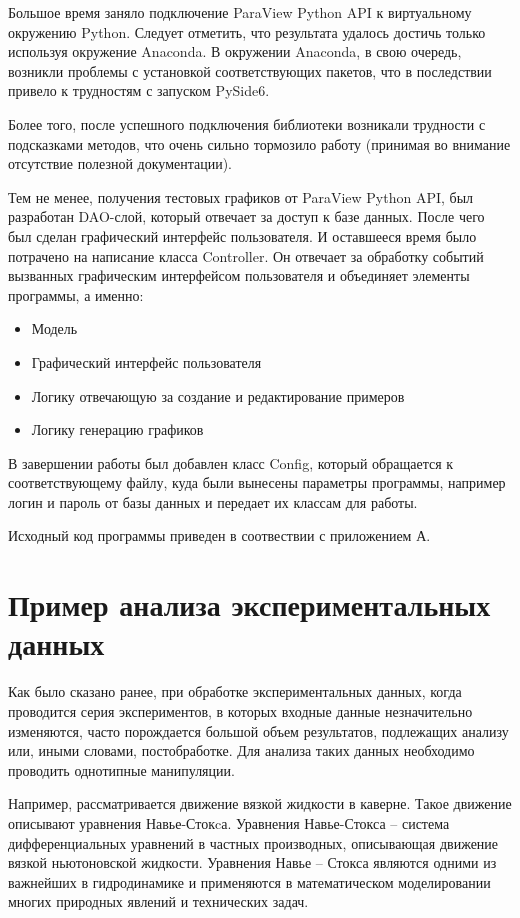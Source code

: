 \documentclass[14pt]{extreport}
\begin{document}
Большое время заняло подключение ParaView Python API к виртуальному окружению Python. Следует отметить, что результата удалось достичь только используя окружение Anaconda. В окружении Anaconda, в свою очередь, возникли проблемы с установкой соответствующих пакетов, что в последствии привело к трудностям с запуском PySide6. 

Более того, после успешного подключения библиотеки возникали трудности с подсказками методов, что очень сильно тормозило работу (принимая во внимание отсутствие полезной документации).

Тем не менее, получения тестовых графиков от ParaView Python API, был разработан DAO-слой, который отвечает за доступ к базе данных. После чего был сделан графический интерфейс пользователя. И оставшееся время было потрачено на написание класса Controller. Он отвечает за обработку событий вызванных графическим интерфейсом пользователя и объединяет элементы программы, а именно: 
\begin{itemize}
	\item Модель
	\item Графический интерфейс пользователя
	\item Логику отвечающую за создание и редактирование примеров
	\item Логику генерацию графиков
\end{itemize}

В завершении работы был добавлен класс Config, который обращается к соответствующему файлу, куда были вынесены параметры программы, например логин и пароль от базы данных и передает их классам для работы.

Исходный код программы приведен в соотвествии с приложением А.

\chapter{Пример анализа экспериментальных данных}

Как было сказано ранее, при обработке экспериментальных данных, когда проводится серия экспериментов, в которых входные данные незначительно изменяются, часто порождается большой объем результатов, подлежащих анализу или, иными словами, постобработке. Для анализа таких данных необходимо проводить однотипные манипуляции. 

Например, рассматривается движение вязкой жидкости в каверне. Такое движение описывают уравнения Навье-Стокcа. Уравнения Навье-Стокса -- система дифференциальных уравнений в частных производных, описывающая движение вязкой ньютоновской жидкости. Уравнения Навье -- Стокса являются одними из важнейших в гидродинамике и применяются в математическом моделировании многих природных явлений и технических задач. 
\end{document}
